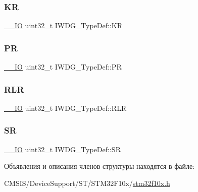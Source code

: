 \subsubsection{\texorpdfstring{KR}{KR}}
{\footnotesize\ttfamily \mbox{\hyperlink{group___c_m_s_i_s___c_m3__core__definitions_gaec43007d9998a0a0e01faede4133d6be}{\+\_\+\+\_\+\+IO}} uint32\+\_\+t I\+W\+D\+G\+\_\+\+Type\+Def\+::\+KR}

\mbox{\label{struct_i_w_d_g___type_def_a5f2717885ff171e686e0347af9e6b68d}} 
\subsubsection{\texorpdfstring{PR}{PR}}
{\footnotesize\ttfamily \mbox{\hyperlink{group___c_m_s_i_s___c_m3__core__definitions_gaec43007d9998a0a0e01faede4133d6be}{\+\_\+\+\_\+\+IO}} uint32\+\_\+t I\+W\+D\+G\+\_\+\+Type\+Def\+::\+PR}

\mbox{\label{struct_i_w_d_g___type_def_aa3703eaa40e447dcacc69c0827595532}} 
\subsubsection{\texorpdfstring{RLR}{RLR}}
{\footnotesize\ttfamily \mbox{\hyperlink{group___c_m_s_i_s___c_m3__core__definitions_gaec43007d9998a0a0e01faede4133d6be}{\+\_\+\+\_\+\+IO}} uint32\+\_\+t I\+W\+D\+G\+\_\+\+Type\+Def\+::\+R\+LR}

\mbox{\label{struct_i_w_d_g___type_def_a9bbfbe921f2acfaf58251849bd0a511c}} 
\subsubsection{\texorpdfstring{SR}{SR}}
{\footnotesize\ttfamily \mbox{\hyperlink{group___c_m_s_i_s___c_m3__core__definitions_gaec43007d9998a0a0e01faede4133d6be}{\+\_\+\+\_\+\+IO}} uint32\+\_\+t I\+W\+D\+G\+\_\+\+Type\+Def\+::\+SR}



Объявления и описания членов структуры находятся в файле\+:\begin{DoxyCompactItemize}
\item 
C\+M\+S\+I\+S/\+Device\+Support/\+S\+T/\+S\+T\+M32\+F10x/\mbox{\hyperlink{stm32f10x_8h}{stm32f10x.\+h}}\end{DoxyCompactItemize}
